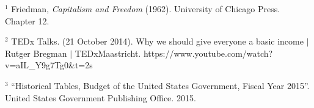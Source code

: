 \documentclass[12pt]{article}
\begin{document}
\bigskip
\begin{footnotesize}
\noindent $^1$ Friedman, \emph{Capitalism and Freedom} (1962). University of Chicago Press. Chapter 12.

\noindent $^2$ TEDx Talks. (21 October 2014). Why we should give everyone a basic income $|$ Rutger Bregman $|$ TEDxMaastricht. https://www.youtube.com/watch?v=aIL\_Y9g7Tg0\&t=2s

\noindent $^3$ ``Historical Tables, Budget of the United States Government, Fiscal Year 2015''. United States Government Publishing Office. 2015.

\end{footnotesize}
\end{document}
